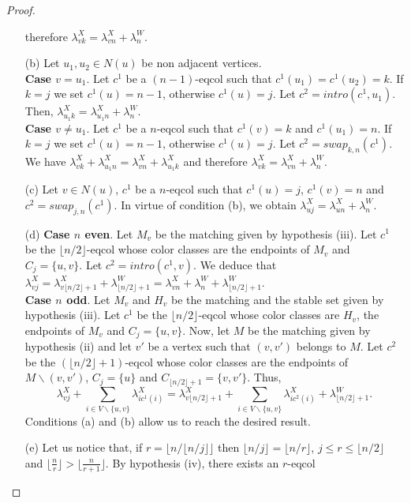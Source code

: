 \begin{proof}
\begin{enumerate}
therefore $\lambda^X_{vk} = \lambda^X_{vn} + \lambda^W_n$.
\item[(b)] Let $u_1, u_2 \in N(u)$ be non adjacent vertices.\\
\textbf{Case $v = u_1$}. Let $c^1$ be a $(n-1)$-eqcol such that $c^1(u_1) = c^1(u_2) = k$. If
$k = j$ we set $c^1(u) = n-1$, otherwise $c^1(u) = j$. Let $c^2 = intro(c^1,u_1)$.
Then, $\lambda^X_{u_1 k} = \lambda^X_{u_1 n} + \lambda^W_n$.\\
\textbf{Case $v \neq u_1$}. Let $c^1$ be a $n$-eqcol such that $c^1(v) = k$ and $c^1(u_1) = n$. If $k = j$ we set
$c^1(u) = n-1$, otherwise $c^1(u) = j$. Let $c^2 = swap_{k,n}(c^1)$.
We have $\lambda^X_{vk} + \lambda^X_{u_1 n} = \lambda^X_{vn} + \lambda^X_{u_1 k}$ and therefore
$\lambda^X_{vk} = \lambda^X_{vn} + \lambda^W_n$.
\item[(c)] Let $v \in N(u)$, $c^1$ be a $n$-eqcol such that $c^1(u) = j$, $c^1(v) = n$ and
$c^2 = swap_{j,n}(c^1)$. In virtue of condition (b), we obtain $\lambda^X_{uj} = \lambda^X_{un} + \lambda^W_n$.
\item[(d)]  \textbf{Case $n$ even}. Let $M_v$ be the matching given by hypothesis (iii). Let $c^1$ be the
$\lfloor n/2 \rfloor$-eqcol whose color classes are the endpoints of $M_v$ and $C_j = \{u, v\}$.
Let $c^2 = intro(c^1,v)$. We deduce that
$\lambda^X_{vj} = \lambda^X_{v\lfloor n/2 \rfloor + 1} + \lambda^W_{\lfloor n/2 \rfloor + 1}
= \lambda^X_{vn} + \lambda^W_n + \lambda^W_{\lfloor n/2 \rfloor + 1}$.\\
\textbf{Case $n$ odd}. Let $M_v$ and $H_v$ be the matching and the stable set given by hypothesis (iii). Let
$c^1$ be the $\lfloor n/2 \rfloor$-eqcol whose color classes are $H_v$, the endpoints of $M_v$ and $C_j = \{u, v\}$.
Now, let $M$ be the matching given by hypothesis (ii) and let $v'$ be a vertex such that $(v, v')$ belongs to $M$.
Let $c^2$ be the $(\lfloor n/2 \rfloor + 1)$-eqcol
whose color classes are the endpoints of $M \backslash (v, v')$, $C_j = \{u\}$ and
$C_{\lfloor n/2 \rfloor+1} = \{ v, v' \}$.
Thus,
\[ \lambda^X_{vj} + \sum_{i \in V \backslash \{u, v\}} \lambda^X_{ic^1(i)} =
\lambda^X_{v\lfloor n/2 \rfloor + 1} + \sum_{i \in V \backslash \{u, v\}} \lambda^X_{ic^2(i)}
+ \lambda^W_{\lfloor n/2 \rfloor + 1}. \]
Conditions (a) and (b) allow us to reach the desired result.
\item[(e)] Let us notice that, if $r = \lfloor n/\lfloor n/j\rfloor \rfloor$ then
$\lfloor n/j \rfloor = \lfloor n/r \rfloor$, $j \leq r \leq \lfloor n/2 \rfloor$ and
$\lfloor \frac{n}{r} \rfloor > \lfloor \frac{n}{r+1} \rfloor$. By hypothesis (iv), there exists an $r$-eqcol

\end{enumerate}
\end{proof}
